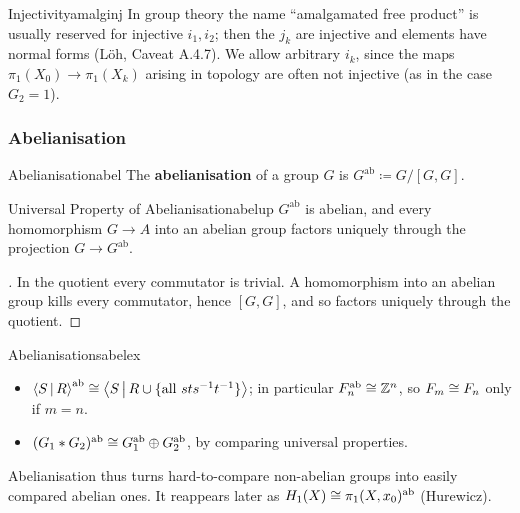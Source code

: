\begin{remark}{Injectivity}{amalginj}
  In group theory the name ``amalgamated free product'' is usually reserved for injective $i_1,i_2$; then the $j_k$ are injective and elements have normal forms (Löh, Caveat A.4.7). We allow arbitrary $i_k$, since the maps $\pi_1(X_0)\to\pi_1(X_k)$ arising in topology are often not injective (as in the case $G_2=1$).
\end{remark}

\subsubsection{Abelianisation}

\begin{definition}{Abelianisation}{abel}
  The \textbf{abelianisation} of a group $G$ is $G^{\mathrm{ab}}\coloneq G/[G,G]$.
\end{definition}

\begin{proposition}{Universal Property of Abelianisation}{abelup}
  $G^{\mathrm{ab}}$ is abelian, and every homomorphism $G\to A$ into an abelian group factors uniquely through the projection $G\to G^{\mathrm{ab}}$.
\end{proposition}

\begin{proof}[]
  In the quotient every commutator is trivial. A homomorphism into an abelian group kills every commutator, hence $[G,G]$, and so factors uniquely through the quotient.
\end{proof}

\begin{example}{Abelianisations}{abelex}
  \begin{itemize}
    \item $\left\langle S\,\middle|\,R\right\rangle^{\mathrm{ab}}\cong\left\langle S\,\middle|\,R\cup\{\text{all } sts^{-1}t^{-1}\}\right\rangle$; in particular $F_n^{\mathrm{ab}}\cong\mathbb{Z}^n$, so $F_m\cong F_n$ only if $m=n$.
    \item $(G_1\ast G_2)^{\mathrm{ab}}\cong G_1^{\mathrm{ab}}\oplus G_2^{\mathrm{ab}}$, by comparing universal properties.
  \end{itemize}
  Abelianisation thus turns hard-to-compare non-abelian groups into easily compared abelian ones. It reappears later as $H_1(X)\cong\pi_1(X,x_0)^{\mathrm{ab}}$ (Hurewicz).
\end{example}
